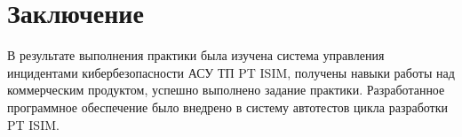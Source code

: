 \section{Заключение}
В результате выполнения практики была изучена система управления инцидентами кибербезопасности АСУ ТП PT ISIM, получены навыки работы над коммерческим продуктом, успешно выполнено задание практики. Разработанное программное обеспечение было внедрено в систему автотестов цикла разработки PT ISIM.